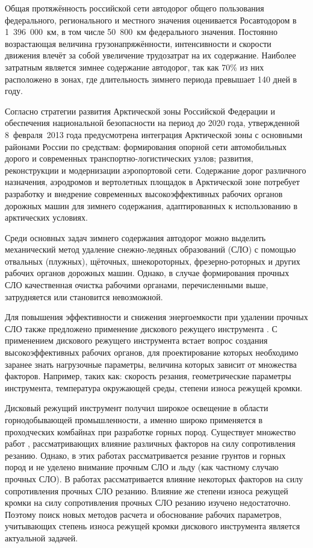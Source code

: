 {\actuality} Общая протяжённость российской сети автодорог общего пользования федерального, регионального и местного значения оценивается Росавтодором в 1~396~000~км, в том числе 50~800~км федерального значения. Постоянно возрастающая величина грузонапряжённости, интенсивности и скорости движения влечёт за собой увеличение трудозатрат на их содержание. Наиболее затратным является зимнее содержание автодорог, так как 70\% из них расположено в зонах, где длительность зимнего периода превышает 140 дней в году.

Согласно стратегии развития Арктической зоны Российской Федерации и обеспечения национальной безопасности на период до 2020 года, утвержденной 8~февраля~2013 года предусмотрена интеграция Арктической зоны с основными районами России по средствам: формирования опорной сети автомобильных дорого и современных транспортно-логистических узлов; развития, реконструкции и модернизации аэропортовой сети. Содержание дорог различного назначения, аэродромов и вертолетных площадок в Арктической зоне потребует разработку и внедрение современных высокоэффективных рабочих органов дорожных машин для зимнего содержания, адаптированных к использованию в арктических условиях.

Среди основных задач зимнего содержания автодорог можно выделить механический метод удаление снежно-ледяных образований (СЛО) с помощью отвальных (плужных), щёточных, шнекороторных, фрезерно-роторных и других рабочих органов дорожных машин. Однако, в случае формирования прочных СЛО качественная очистка рабочими органами, перечисленными выше, затрудняется или становится невозможной.

Для повышения эффективности и снижения энергоемкости при удалении прочных СЛО также предложено применение дискового режущего инструмента . С применением дискового режущего инструмента встает вопрос создания высокоэффективных рабочих органов, для проектирование которых необходимо заранее знать нагрузочные параметры, величина которых зависит от множества факторов. Например, таких как: скорость резания, геометрические параметры инструмента, температура окружающей среды, степени износа режущей кромки.

Дисковый режущий инструмент получил широкое освещение в области горнодобывающей промышленности, а именно широко применяется в проходческих комбайнах при разработке горных пород. Существует множество работ \todo{[литература]}, рассматривающих влияние различных факторов на силу сопротивления резанию. Однако, в этих работах рассматривается резание грунтов и горных пород и не уделено внимание прочным СЛО и льду (как частному случаю прочных СЛО). В работах  рассматривается влияние некоторых факторов на силу сопротивления прочных СЛО резанию. Влияние же степени износа режущей кромки на силу сопротивления прочных СЛО резанию изучено недостаточно. Поэтому поиск новых методов расчета и обоснование рабочих параметров, учитывающих степень износа режущей кромки дискового инструмента является актуальной задачей.


